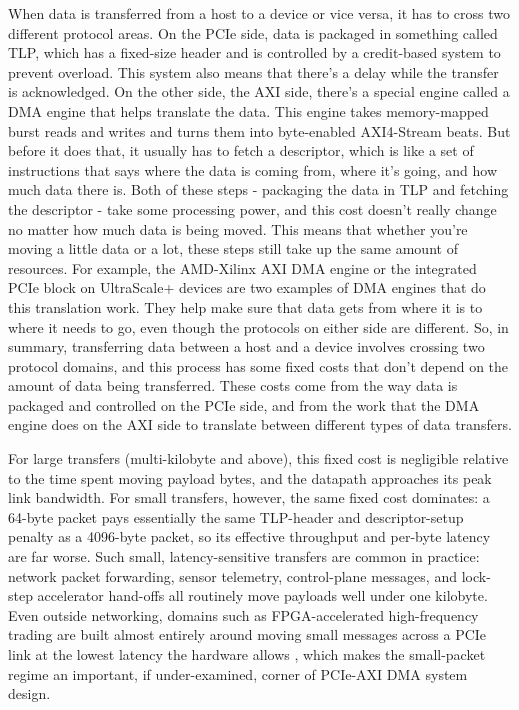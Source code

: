 When data is transferred from a host to a device or vice versa, it has to cross two different protocol areas. On the PCIe side, data is packaged in something called TLP, which has a fixed-size header and is controlled by a credit-based system to prevent overload. This system also means that there's a delay while the transfer is acknowledged. On the other side, the AXI side, there's a special engine called a DMA engine that helps translate the data. This engine takes memory-mapped burst reads and writes and turns them into byte-enabled AXI4-Stream beats. But before it does that, it usually has to fetch a descriptor, which is like a set of instructions that says where the data is coming from, where it's going, and how much data there is. Both of these steps - packaging the data in TLP and fetching the descriptor - take some processing power, and this cost doesn't really change no matter how much data is being moved. This means that whether you're moving a little data or a lot, these steps still take up the same amount of resources. For example, the AMD-Xilinx AXI DMA engine or the integrated PCIe block on UltraScale+ devices are two examples of DMA engines that do this translation work. They help make sure that data gets from where it is to where it needs to go, even though the protocols on either side are different. So, in summary, transferring data between a host and a device involves crossing two protocol domains, and this process has some fixed costs that don't depend on the amount of data being transferred. These costs come from the way data is packaged and controlled on the PCIe side, and from the work that the DMA engine does on the AXI side to translate between different types of data transfers.

For large transfers (multi-kilobyte and above), this fixed cost is negligible relative to the time spent moving payload bytes, and the datapath approaches its peak link bandwidth. For small transfers, however, the same fixed cost dominates: a 64-byte packet pays essentially the same TLP-header and descriptor-setup penalty as a 4096-byte packet, so its effective throughput and per-byte latency are far worse. Such small, latency-sensitive transfers are common in practice: network packet forwarding, sensor telemetry, control-plane messages, and lock-step accelerator hand-offs all routinely move payloads well under one kilobyte. Even outside networking, domains such as FPGA-accelerated high-frequency trading are built almost entirely around moving small messages across a PCIe link at the lowest latency the hardware allows \cite{gupta2024fpga}, which makes the small-packet regime an important, if under-examined, corner of PCIe-AXI DMA system design.

